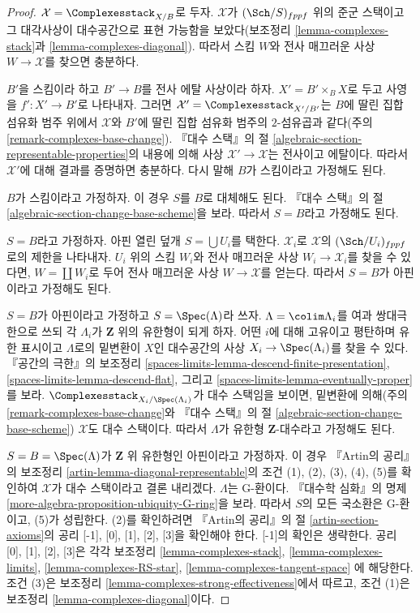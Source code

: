 \begin{proof}
$\mathcal{X} = \Complexesstack_{X/B}$로 두자. $\mathcal{X}$가
$(\Sch/S)_{fppf}$ 위의 준군 스택이고 그 대각사상이 대수공간으로 표현
가능함을 보았다(보조정리 \ref{lemma-complexes-stack}과
\ref{lemma-complexes-diagonal}). 따라서 스킴 $W$와 전사 매끄러운 사상
$W \to \mathcal{X}$를 찾으면 충분하다.

\medskip\noindent
$B'$을 스킴이라 하고 $B' \to B$를 전사 에탈 사상이라 하자.
$X' = B' \times_B X$로 두고 사영을 $f' : X' \to B'$로 나타내자. 그러면
$\mathcal{X}' = \Complexesstack_{X'/B'}$는 $B$에 딸린 집합 섬유화 범주 위에서
$\mathcal{X}$와 $B'$에 딸린 집합 섬유화 범주의 $2$-섬유곱과 같다(주의
\ref{remark-complexes-base-change}). 『대수 스택』의 절
\ref{algebraic-section-representable-properties}의 내용에 의해 사상
$\mathcal{X}' \to \mathcal{X}$는 전사이고 에탈이다. 따라서
$\mathcal{X}'$에 대해 결과를 증명하면 충분하다. 다시 말해 $B$가 스킴이라고
가정해도 된다.

\medskip\noindent
$B$가 스킴이라고 가정하자. 이 경우 $S$를 $B$로 대체해도 된다.
『대수 스택』의 절 \ref{algebraic-section-change-base-scheme}을 보라.
따라서 $S = B$라고 가정해도 된다.

\medskip\noindent
$S = B$라고 가정하자. 아핀 열린 덮개 $S = \bigcup U_i$를 택한다.
$\mathcal{X}_i$로 $\mathcal{X}$의 $(\Sch/U_i)_{fppf}$로의 제한을 나타내자.
$U_i$ 위의 스킴 $W_i$와 전사 매끄러운 사상 $W_i \to \mathcal{X}_i$를 찾을 수
있다면, $W = \coprod W_i$로 두어 전사 매끄러운 사상 $W \to \mathcal{X}$를
얻는다. 따라서 $S = B$가 아핀이라고 가정해도 된다.

\medskip\noindent
$S = B$가 아핀이라고 가정하고 $S = \Spec(\Lambda)$라 쓰자.
$\Lambda = \colim \Lambda_i$를 여과 쌍대극한으로 쓰되 각 $\Lambda_i$가
$\mathbf{Z}$ 위의 유한형이 되게 하자. 어떤 $i$에 대해 고유이고 평탄하며
유한 표시이고 $\Lambda$로의 밑변환이 $X$인 대수공간의 사상
$X_i \to \Spec(\Lambda_i)$를 찾을 수 있다. 『공간의 극한』의 보조정리
\ref{spaces-limits-lemma-descend-finite-presentation},
\ref{spaces-limits-lemma-descend-flat}, 그리고
\ref{spaces-limits-lemma-eventually-proper}
를 보라. $\Complexesstack_{X_i/\Spec(\Lambda_i)}$가 대수 스택임을 보이면,
밑변환에 의해(주의 \ref{remark-complexes-base-change}와 『대수 스택』의 절
\ref{algebraic-section-change-base-scheme}) $\mathcal{X}$도 대수 스택이다.
따라서 $\Lambda$가 유한형 $\mathbf{Z}$-대수라고 가정해도 된다.

\medskip\noindent
$S = B = \Spec(\Lambda)$가 $\mathbf{Z}$ 위 유한형인 아핀이라고 가정하자.
이 경우 『Artin의 공리』의 보조정리 \ref{artin-lemma-diagonal-representable}의
조건 (1), (2), (3), (4), (5)를 확인하여 $\mathcal{X}$가 대수 스택이라고
결론 내리겠다. $\Lambda$는 G-환이다. 『대수학 심화』의 명제
\ref{more-algebra-proposition-ubiquity-G-ring}을 보라. 따라서 $S$의 모든
국소환은 G-환이고, (5)가 성립한다. (2)를 확인하려면 『Artin의 공리』의 절
\ref{artin-section-axioms}의 공리 [-1], [0], [1], [2], [3]을 확인해야 한다.
[-1]의 확인은 생략한다. 공리 [0], [1], [2], [3]은 각각 보조정리
\ref{lemma-complexes-stack},
\ref{lemma-complexes-limits},
\ref{lemma-complexes-RS-star},
\ref{lemma-complexes-tangent-space}
에 해당한다. 조건 (3)은 보조정리
\ref{lemma-complexes-strong-effectiveness}에서 따르고, 조건 (1)은 보조정리
\ref{lemma-complexes-diagonal}이다.


\end{proof}
